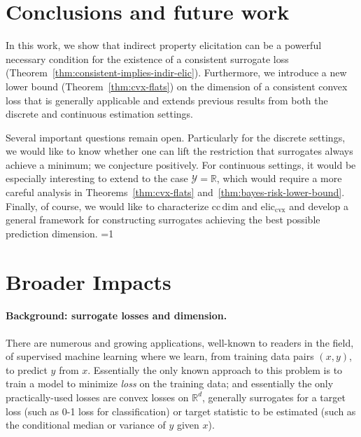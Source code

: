 \documentclass{article}
\newcommand{\Comments}{1}
\newcommand{\mytodo}[2]{\ifnum\Comments=1%
	\todo[linecolor=#1!80!black,backgroundcolor=#1,bordercolor=#1!80!black]{#2}\fi}
\newcommand{\btw}[1]{\mytodo{gray!10!white}{\textcolor{gray}{BTW: #1}}}%
\newcommand{\reals}{\mathbb{R}}
\newcommand{\eliccvx}{\mathrm{elic}_\mathrm{cvx}}
\newcommand{\ccdim}{\mathrm{cc\,dim}}
\newcommand{\Y}{\mathcal{Y}}
\begin{document}
\section{Conclusions and future work}\label{sec:conclusions}
In this work, we show that indirect property elicitation can be a powerful necessary condition for the existence of a consistent surrogate loss (Theorem~\ref{thm:consistent-implies-indir-elic}).
Furthermore, we introduce a new lower bound (Theorem~\ref{thm:cvx-flats}) on the dimension of a consistent convex loss that is generally applicable and extends previous results from both the discrete and continuous estimation settings.

Several important questions remain open.
Particularly for the discrete settings, we would like to know whether one can lift the restriction that surrogates always achieve a minimum; we conjecture positively.
For continuous settings, it would be especially interesting to extend to the case $\Y=\reals$, which would require a more careful analysis in Theorems~\ref{thm:cvx-flats} and~\ref{thm:bayes-risk-lower-bound}.
Finally, of course, we would like to characterize $\ccdim$ and $\eliccvx$ and develop a general framework for constructing surrogates achieving the best possible prediction dimension.
\btw{Some good questions commented out here; revisit if we have space}

\newpage

\section*{Broader Impacts}
\paragraph{Background: surrogate losses and dimension.} There are numerous and growing applications, well-known to readers in the field, of supervised machine learning where we learn, from training data pairs $(x,y)$, to predict $y$ from $x$.
Essentially the only known approach to this problem is to train a model to minimize \emph{loss} on the training data; and essentially the only practically-used losses are convex losses on $\reals^d$, generally surrogates for a target loss (such as 0-1 loss for classification) or target statistic to be estimated (such as the conditional median or variance of $y$ given $x$).
\end{document}
